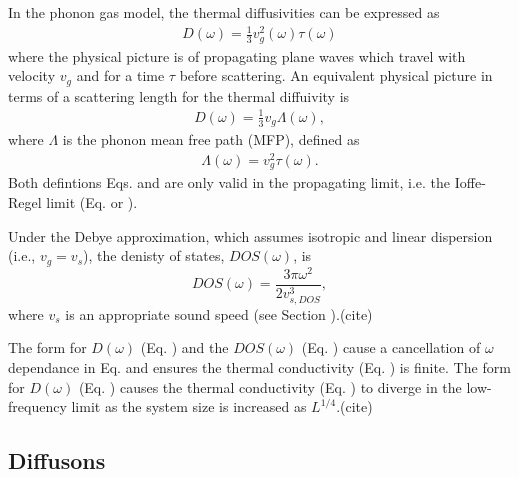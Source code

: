\documentclass[aps,prb,twocolumn,superscriptaddress,footinbib,amsmath,amssymb,floatfix]{revtex4}
\begin{document}
In the phonon gas model, the thermal diffusivities can be expressed as
\begin{equation}\label{EQ:Dtau}
\begin{split}
D(\omega) = \frac{1}{3}v^2_g(\omega)\tau(\omega)
\end{split}
\end{equation}
where the physical picture is of propagating plane waves which 
travel with velocity $v_g$ and for a time $\tau$ before scattering. 
An equivalent physical picture in terms of a scattering length 
for the thermal diffuivity is
\begin{equation}\label{EQ:DLambda}
\begin{split}
D(\omega) = \frac{1}{3}v_g \Lambda(\omega),
\end{split}
\end{equation}
where $\Lambda$ is the phonon mean free path (MFP), defined as 
\begin{equation}\label{EQ:Lambda}
\begin{split}
\Lambda(\omega) = v^{2}_{g} \tau(\omega).
\end{split}
\end{equation}
Both defintions Eqs. and are only valid in the propagating 
limit, i.e. the Ioffe-Regel limit (Eq. or ). 

Under the Debye approximation, 
which assumes isotropic and linear dispersion (i.e., $v_g = v_s$), 
the denisty of states, $DOS(\omega)$, is
\begin{equation}\label{EQ:DOS_debye}
DOS(\omega) = \frac{3\pi\omega^2}{2v_{s,DOS}^3},
\end{equation}
where $v_s$ is an appropriate sound speed (see Section ).(cite)

The form for $D(\omega)$ (Eq. ) and the $DOS(\omega)$ (Eq. ) 
cause a cancellation of $\omega$ dependance in Eq. and ensures the 
thermal conductivity (Eq. ) is finite. The form for $D(\omega)$ 
(Eq. ) causes the thermal conductivity (Eq. ) to diverge 
in the low-frequency limit as the system size is increased as 
$L^{1/4}$.(cite)  

\subsection{\label{S:Theory:Thermal:Diffusons}Diffusons}
\end{document}
